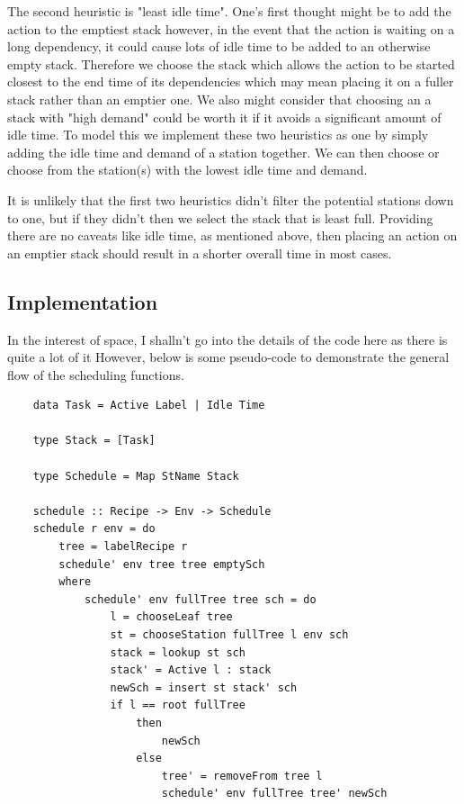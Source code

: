 \documentclass[11pt]{article}
\begin{document}
\medbreak

The second heuristic is "least idle time". One's first thought might be to add the action to the emptiest
stack however, in the event that the action is waiting on a long dependency, it could cause lots of idle
time to be added to an otherwise empty stack. Therefore we choose the stack which allows the action to be
started closest to the end time of its dependencies which may mean placing it on a fuller stack rather than
an emptier one. We also might consider that choosing an a stack with "high demand" could be worth it if
it avoids a significant amount of idle time. To model this we implement these two heuristics as one by
simply adding the idle time and demand of a station together. We can then choose or choose from the
station(s) with the lowest idle time and demand.

\medbreak

It is unlikely that the first two heuristics didn't filter the potential stations down to one, but if they
didn't then we select the stack that is least full. Providing there are no caveats like idle time, as mentioned
above, then placing an action on an emptier stack should result in a shorter overall time in most cases.

\subsection{Implementation}

In the interest of space, I shalln't go into the details of the code here as there is quite a lot of it
However, below is some pseudo-code to demonstrate the general flow of the scheduling functions.

\begin{lstlisting}
    data Task = Active Label | Idle Time

    type Stack = [Task]

    type Schedule = Map StName Stack

    schedule :: Recipe -> Env -> Schedule
    schedule r env = do
        tree = labelRecipe r
        schedule' env tree tree emptySch
        where
            schedule' env fullTree tree sch = do
                l = chooseLeaf tree
                st = chooseStation fullTree l env sch
                stack = lookup st sch
                stack' = Active l : stack
                newSch = insert st stack' sch
                if l == root fullTree
                    then
                        newSch
                    else
                        tree' = removeFrom tree l
                        schedule' env fullTree tree' newSch
\end{lstlisting}
\end{document}
